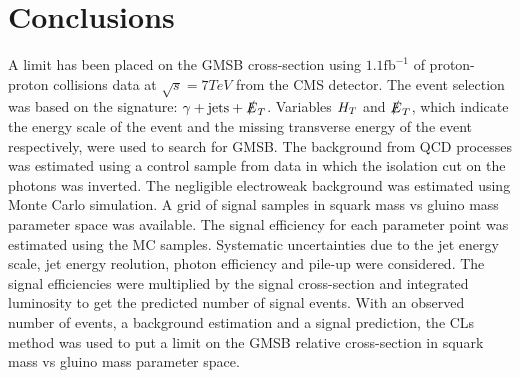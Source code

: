 \chapter{Conclusions}

A limit has been placed on the GMSB cross-section using
$1.1\unit{\mathrm{fb}^{-1}}$ of proton-proton collisions data at $\sqrt{s} =
7\unit{TeV}$ from the CMS detector. The event selection was based on the 
signature: $\gamma+\mbox{jets}+\slashed{E}_{T}$. Variables $H_{T}$ and $\slashed{E}_{T}$, which indicate
the energy scale of the event and the missing transverse energy of the event
respectively, were used to search for GMSB. The background from QCD processes was 
estimated using a control sample from data in which the isolation cut on the 
photons was inverted. The negligible electroweak background was estimated using
Monte Carlo simulation. A grid of signal samples in squark mass vs gluino mass
parameter space was available. The signal efficiency for each parameter point was 
estimated using the MC samples. Systematic uncertainties due to the jet energy
scale, jet energy reolution, photon efficiency and pile-up were considered. The
signal efficiencies were multiplied by the signal cross-section and integrated 
luminosity to get the predicted number of signal events. With an observed number
of events, a background estimation and a signal prediction, the CLs method was
used to put a limit on the GMSB relative cross-section in squark mass vs gluino
mass parameter space.  
